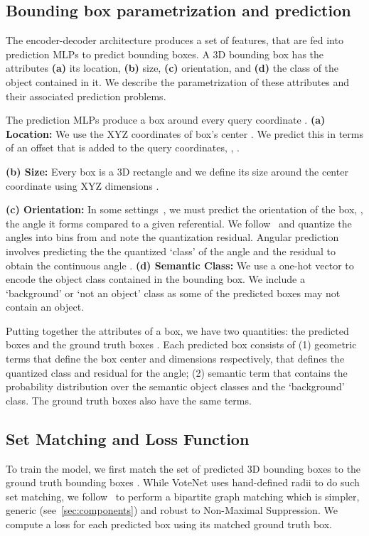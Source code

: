 \documentclass[10pt,twocolumn,letterpaper]{article}
\begin{document}
\subsection{Bounding box parametrization and prediction}
\label{sec:bounding_box_param}
The encoder-decoder architecture produces a set of  features, that are fed into prediction MLPs to predict bounding boxes.
A 3D bounding box has the attributes
\textbf{(a)} its location, \textbf{(b)} size, \textbf{(c)} orientation, and \textbf{(d)} the class of the object contained in it.
We describe the parametrization of these attributes and their associated prediction problems.

The prediction MLPs produce a box around every query coordinate .
\noindent\textbf{(a) Location:} We use the XYZ coordinates of box's center .
We predict this in terms of an offset  that is added to the query coordinates, \ie, .


\noindent\textbf{(b) Size:} Every box is a 3D rectangle and we define its size around the center coordinate  using XYZ dimensions .

\noindent\textbf{(c) Orientation:} In some settings~\cite{song2015sun}, we must predict the orientation of the box, \ie, the angle it forms compared to a given referential.
We follow~\cite{qi2019votenet} and quantize the angles into  bins from  and note the quantization residual.
Angular prediction involves predicting the the quantized `class' of the angle and the residual to obtain the continuous angle .
\noindent\textbf{(d) Semantic Class:} We use a one-hot vector  to encode the object class contained in the bounding box.
We include a `background' or `not an object' class as some of the predicted boxes may not contain an object.

Putting together the attributes of a box, we have two quantities: the predicted boxes  and the ground truth boxes .
Each predicted box  consists of (1) geometric terms  that define the box center and dimensions respectively,  that defines the quantized class and residual for the angle; (2) semantic term  that contains the probability distribution over the  semantic object classes and the `background' class.
The ground truth boxes  also have the same terms.

\subsection{Set Matching and Loss Function}
\label{sec:set_loss}
To train the model, we first match the set of  predicted 3D bounding boxes  to the ground truth bounding boxes .
While VoteNet uses hand-defined radii to do such set matching, we follow~\cite{carion2020end} to perform a bipartite graph matching which is simpler, generic (see~\cref{sec:components}) and robust to Non-Maximal Suppression.
We compute a loss for each predicted box using its matched ground truth box.
\end{document}
